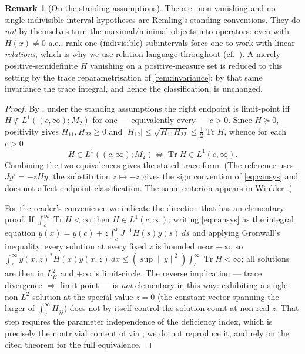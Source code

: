 \documentclass[12pt,a4paper]{amsart}
\theoremstyle{plain}
\theoremstyle{definition}
\newtheorem{remark}[theorem]{Remark}
\newcommand{\Tr}{\operatorname{Tr}}
\newcommand{\Ham}{H}
\begin{document}
\begin{remark}[On the standing assumptions]\label{rem:definite}
  The a.e.\ non-vanishing and no-single-indivisible-interval hypotheses
  are Remling's standing conventions.  They do \emph{not} by themselves
  turn the maximal/minimal objects into operators: even with
  $\Ham(x)\neq0$ a.e., rank-one (indivisible) subintervals force one to
  work with linear \emph{relations}, which is why we use relation language
  throughout (cf.\ \cite[Theorem~2.25]{Remling2018}).  A merely
  positive-semidefinite $\Ham$ vanishing on a positive-measure set is
  reduced to this setting by the trace reparametrisation of
  \cref{rem:invariance}; by that same invariance the trace integral, and
  hence the classification, is unchanged.
\end{remark}

\begin{proof}
  By \cite[Theorem~3.5]{Remling2018}, under the standing assumptions the
  right endpoint is limit-point iff
  $\Ham \notin L^1((c,\infty);M_2)$ for one --- equivalently every ---
  $c>0$.  Since $\Ham \succeq 0$, positivity gives $\Ham_{11},\Ham_{22}\ge0$
  and $|\Ham_{12}| \le \sqrt{\Ham_{11}\Ham_{22}} \le \tfrac12\Tr\Ham$,
  whence for each $c>0$
  \[
    \Ham \in L^1((c,\infty);M_2)
    \iff
    \Tr\Ham \in L^1(c,\infty).
  \]
  Combining the two equivalences gives the stated trace form.  (The
  reference uses $J y' = -z\Ham y$; the substitution $z\mapsto -z$ gives
  the sign convention of \cref{eq:cansys} and does not affect endpoint
  classification.  The same criterion appears in Winkler
  \cite{Winkler1995}.)

  For the reader's convenience we indicate the direction that has an
  elementary proof.  If $\int_c^\infty \Tr\Ham < \infty$ then
  $\Ham \in L^1(c,\infty)$; writing \cref{eq:cansys} as the integral
  equation $y(x) = y(c) + z\!\int_c^x J^{-1}\Ham(s)y(s)\,ds$ and applying
  Gronwall's inequality, every solution at every fixed $z$ is bounded
  near $+\infty$, so
  $\int_c^\infty y(x,z)^*\Ham(x)y(x,z)\,dx
   \le (\sup\|y\|^2)\int_c^\infty \Tr\Ham < \infty$;
  all solutions are then in $L^2_\Ham$ and $+\infty$ is limit-circle.
  The reverse implication --- trace divergence $\Rightarrow$ limit-point
  --- is \emph{not} elementary in this way: exhibiting a single non-$L^2$
  solution at the special value $z=0$ (the constant vector spanning the
  larger of $\int_c^\infty\Ham_{jj}$) does not by itself control the
  solution count at non-real $z$.  That step requires the parameter
  independence of the deficiency index, which is precisely the nontrivial
  content of \cite[Theorem~3.5]{Remling2018} via
  \cite[Lemma~3.7]{Remling2018}; we do not reproduce it, and rely on the
  cited theorem for the full equivalence.
\end{proof}
\end{document}
